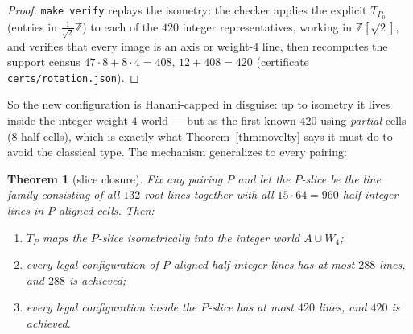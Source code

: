 \documentclass[11pt]{article}
\newtheorem{theorem}{Theorem}
\theoremstyle{remark}
\newcommand{\ZZ}{\mathbb{Z}}
\begin{document}
\begin{proof}
\texttt{make verify} replays the isometry: the checker applies the
explicit $T_{P_0}$ (entries in $\tfrac1{\sqrt2}\ZZ$) to each of the
$420$ integer representatives, working in $\ZZ[\sqrt2]$, and verifies that
every image is an axis or weight-$4$ line, then recomputes the support
census $47\cdot8+8\cdot4=408$, $12+408=420$
(certificate \texttt{certs/rotation.json}).
\end{proof}

So the new configuration is Hanani-capped in disguise: up to isometry it
lives inside the integer weight-$4$ world --- but as the first known
$420$ using \emph{partial} cells ($8$ half cells), which is exactly what
Theorem~\ref{thm:novelty} says it must do to avoid the classical type.
The mechanism generalizes to every pairing:

\begin{theorem}[slice closure]\label{thm:slice}
Fix any pairing $P$ and let the \emph{$P$-slice} be the line family
consisting of all $132$ root lines together with all $15\cdot64=960$
half-integer lines in $P$-aligned cells. Then:
\begin{enumerate}
\item[(a)] $T_P$ maps the $P$-slice isometrically into the integer
world $A\cup W_4$;
\item[(b)] every legal configuration of $P$-aligned half-integer lines has
at most $288$ lines, and $288$ is achieved;
\item[(c)] every legal configuration inside the $P$-slice has at most
$420$ lines, and $420$ is achieved.
\end{enumerate}
\end{theorem}
\end{document}
